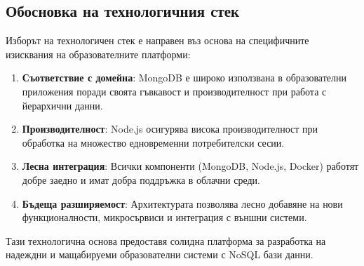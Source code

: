\subsection{Обосновка на технологичния стек}

Изборът на технологичен стек е направен въз основа на специфичните изисквания на образователните платформи:

\begin{enumerate}
    \item \textbf{Съответствие с домейна}: MongoDB е широко използвана в образователни приложения поради своята гъвкавост и производителност при работа с йерархични данни.

    \item \textbf{Производителност}: Node.js осигурява висока производителност при обработка на множество едновременни потребителски сесии.

    \item \textbf{Лесна интеграция}: Всички компоненти (MongoDB, Node.js, Docker) работят добре заедно и имат добра поддръжка в облачни среди.

    \item \textbf{Бъдеща разширяемост}: Архитектурата позволява лесно добавяне на нови функционалности, микросървиси и интеграция с външни системи.
\end{enumerate}

Тази технологична основа предоставя солидна платформа за разработка на надеждни и мащабируеми образователни системи с NoSQL бази данни.
